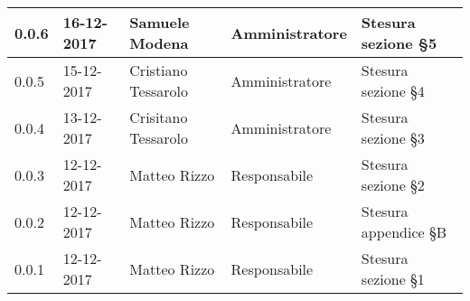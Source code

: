 \documentclass[./PianodiProgetto.tex]{subfiles}
\begin{document}
\begin{longtable}{|p{20mm}|p{20mm}|p{40mm}|p{30mm}|p{50mm}|}
		\hline 0.0.6 & 16-12-2017 & Samuele Modena & Amministratore & Stesura sezione §5 \\
 
		\hline 0.0.5 & 15-12-2017 & Cristiano Tessarolo & Amministratore & Stesura sezione §4 \\
 
		\hline 0.0.4 & 13-12-2017 & Crisitano Tessarolo & Amministratore & Stesura sezione §3 \\
 
		\hline 0.0.3 & 12-12-2017 & Matteo Rizzo & Responsabile & Stesura sezione §2 \\
 
 		\hline 0.0.2 & 12-12-2017 & Matteo Rizzo & Responsabile & Stesura appendice §B \\
 		
		\hline 0.0.1 & 12-12-2017 & Matteo Rizzo & Responsabile & Stesura sezione §1 \\
 
		\hline
 
	\end{longtable}
\end{document}

